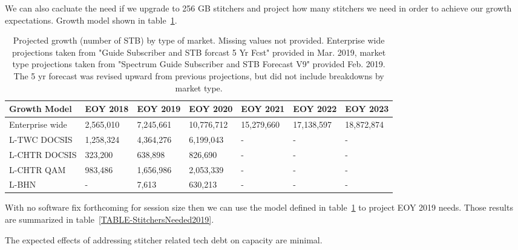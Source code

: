 \documentclass{article}
\begin{document}
We can also cacluate the need if we upgrade to 256 GB stitchers and project how many stitchers we need in order to achieve our growth expectations. Growth model shown in table~\ref{TABLE-GrowthModel}. 

\begin{table}[H]
\begin{tabular}{|l|l|l|l|l|l|l|} 
\hline Growth Model & EOY 2018 & EOY 2019 & EOY 2020 & EOY 2021 & EOY 2022 & EOY 2023\\
\hline Enterprise wide & 2,565,010 & 7,245,661 & 10,776,712 & 15,279,660 & 17,138,597 & 18,872,874 \\
\hline L-TWC DOCSIS & 1,258,324 & 4,364,276 & 6,199,043 & - & - & -\\
\hline L-CHTR DOCSIS & 323,200 & 638,898 & 826,690 & - & - & -\\
\hline L-CHTR QAM & 983,486 & 1,656,986 & 2,053,339 & - & - & -\\
\hline L-BHN & - & 7,613 & 630,213 & - & - & -\\
\hline 
\end{tabular}
\caption{\label{TABLE-GrowthModel}Projected growth (number of STB) by type of market. Missing values not provided. Enterprise wide projections taken from "Guide Subscriber and STB forcast 5 Yr Fcst" provided in Mar. 2019, market type projections taken from "Spectrum Guide Subscriber and STB Forecast V9" provided Feb. 2019. The 5 yr forecast was revised upward from previous projections, but did not include breakdowns by market type.}
\end{table}

With no software fix forthcoming for session size then we can use the model defined in table~\ref{TABLE-GrowthModel} to project EOY 2019 needs. Those results are summarized in table~\ref{TABLE-StitchersNeeded2019}. 

The expected effects of addressing stitcher related tech debt on capacity are minimal. 
\end{document}
